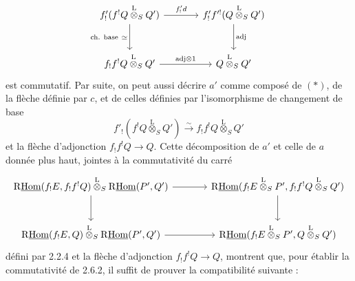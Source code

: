 \[
\begin{tikzcd}[column sep=large,row sep=large]
f'_!(f^!Q\overset{\mathrm{L}}{\otimes}_SQ') \arrow[r,"{f'_!d}"] \arrow[d,"{\text{ch. base}\ \simeq}"'] & f'_!f'^!(Q\overset{\mathrm{L}}{\otimes}_SQ') \arrow[d,"\mathrm{adj}"]\\
f_!f^!Q\overset{\mathrm{L}}{\otimes}_SQ' \arrow[r,"{\mathrm{adj}\otimes 1}"] & Q\overset{\mathrm{L}}{\otimes}_SQ'
\end{tikzcd}
\]
est commutatif. Par suite, on peut aussi décrire $a'$ comme composé de $(*)$, de la flèche définie par $c$, et de celles définies par l'isomorphisme de changement de base
\[
f'_!(f^!Q\overset{\mathrm{L}}{\otimes}_SQ')\xrightarrow{\sim}f_!f^!Q\overset{\mathrm{L}}{\otimes}_SQ'
\]
et la flèche d'adjonction $f_!f^!Q\to Q$. Cette décomposition de $a'$ et celle de $a$ donnée plus haut, jointes à la commutativité du carré
\[
\begin{tikzcd}[column sep=
large,row sep=large]
\mathrm{R}\underline{\mathrm{Hom}}(f_!E,f_!f^!Q)\overset{\mathrm{L}}{\otimes}_S\mathrm{R}\underline{\mathrm{Hom}}(P',Q') \arrow[r] \arrow[d] & \mathrm{R}\underline{\mathrm{Hom}}(f_!E\overset{\mathrm{L}}{\otimes}_SP',f_!f^!Q\overset{\mathrm{L}}{\otimes}_SQ') \arrow[d]\\
\mathrm{R}\underline{\mathrm{Hom}}(f_!E,Q)\overset{\mathrm{L}}{\otimes}_S\mathrm{R}\underline{\mathrm{Hom}}(P',Q') \arrow[r] & \mathrm{R}\underline{\mathrm{Hom}}(f_!E\overset{\mathrm{L}}{\otimes}_SP',Q\overset{\mathrm{L}}{\otimes}_SQ')
\end{tikzcd}
\]
défini par 2.2.4 et la flèche d'adjonction $f_!f^!Q\to Q$, montrent que, pour établir la commutativité de 2.6.2, il suffit de prouver la compatibilité suivante :

